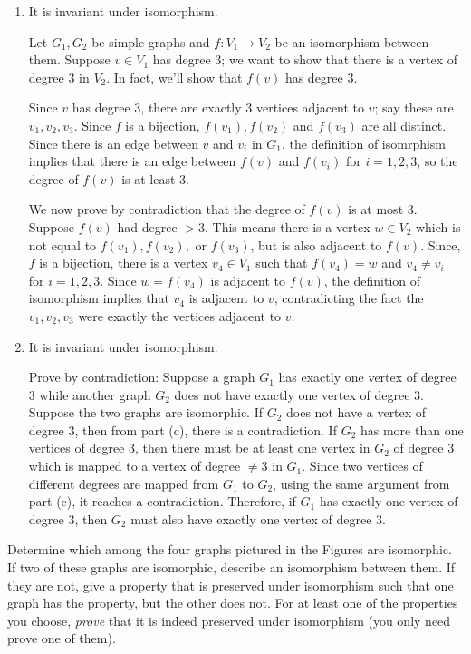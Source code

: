 \documentclass[12pt,twoside]{article} \usepackage{light}
\begin{document}
\begin{problem}{15}
{\begin{enumerate}
\item
 It is invariant under isomorphism.

Let $G_1, G_2$ be simple graphs and $f:V_1\to V_2$ be an isomorphism
between them.  Suppose $v\in V_1$ has degree 3; we want to show that
there is a vertex of degree 3 in $V_2$.  In fact, we'll show that
$f(v)$ has degree 3.
 
Since $v$ has degree 3, there are exactly 3 vertices adjacent to $v$;
say these are $v_1,v_2,v_3$.  Since $f$ is a bijection,
$f(v_1),f(v_2)$ and $f(v_3)$ are all distinct.  Since there is an edge
between $v$ and $v_i$ in $G_1$, the definition of isomrphism implies
that there is an edge between $f(v)$ and $f(v_i)$ for $i=1,2,3$, so
the degree of $f(v)$ is at least 3.
 
We now prove by contradiction that the degree of $f(v)$ is at most 3.
Suppose $f(v)$ had degree $>3$.  This means there is a vertex $w \in
V_2$ which is not equal to $f(v_1), f(v_2),$ or $f(v_3)$, but is also
adjacent to $f(v)$.  Since, $f$ is a bijection, there is a vertex $v_4
\in V_1$ such that $f(v_4) = w$ and $v_4 \neq v_i$ for $i=1,2,3$.
Since $w=f(v_4)$ is adjacent to $f(v)$, the definition of isomorphism
implies that $v_4$ is adjacent to $v$, contradicting the fact the
$v_1,v_2,v_3$ were exactly the vertices adjacent to $v$.

\item
  It is invariant under isomorphism.

Prove by contradiction: Suppose a graph $G_1$ has exactly one vertex
of degree $3$ while another graph $G_2$ does not have exactly one
vertex of degree 3. Suppose the two graphs are isomorphic. If $G_2$
does not have a vertex of degree 3, then from part (c), there is a
contradiction.  If $G_2$ has more than one vertices of degree 3, then
there must be at least one vertex in $G_2$ of degree 3 which is mapped
to a vertex of degree $\neq 3$ in $G_1$. Since two vertices of
different degrees are mapped from $G_1$ to $G_2$, using the same
argument from part (c), it reaches a contradiction. Therefore, if
$G_1$ has exactly one vertex of degree 3, then $G_2$ must also have
exactly one vertex of degree 3.

\end{enumerate}

}  Determine which among the four graphs pictured in the
Figures
are isomorphic.  If two of these graphs are isomorphic, describe an
isomorphism between them.  If they are not, give a property that is
preserved under isomorphism such that one graph has the property, but
the other does not.  For at least one of the properties you choose,
\emph{prove} that it is indeed preserved under isomorphism (you only
need prove one of them).


\end{problem}
\end{document}
